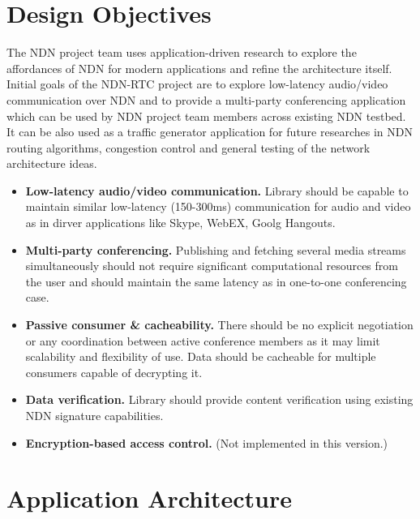 \documentclass{icn/sig-alternate-2012} %
\newcommand{\ndnrtcName}{NDN-RTC} %
\begin{document}

\section{Design Objectives}
\label{sec:goals}
The NDN project team uses application-driven research to explore the affordances of NDN for modern applications and refine the architecture itself.  Initial goals of the \ndnrtcName{} project are to explore low-latency audio/video communication over NDN and to provide a multi-party conferencing application which can be used by NDN project team members across existing NDN testbed. It can be also used as a traffic generator application for future researches in NDN routing algorithms, congestion control and general testing of the network architecture ideas.
\begin{itemize}
\item \textbf{Low-latency audio/video communication.} Library should be capable to maintain similar low-latency (150-300ms)  communication for audio and video as in dirver applications like Skype, WebEX, Goolg Hangouts.

\item \textbf{Multi-party conferencing.} Publishing and fetching several media streams simultaneously should not require significant computational resources from the user and should maintain the same latency as in one-to-one conferencing case.

\item \textbf{Passive consumer \& cacheability.} There should be no explicit negotiation or any coordination between active conference members as it may limit scalability and flexibility of use. Data should be cacheable for multiple consumers capable of decrypting it. 

\item \textbf{Data verification.} Library should provide content verification using existing NDN signature capabilities. 

\item \textbf{Encryption-based access control.}   (Not implemented in this version.)
\end{itemize} 

\section{Application Architecture}
\label{sec:arch}
\end{document}
